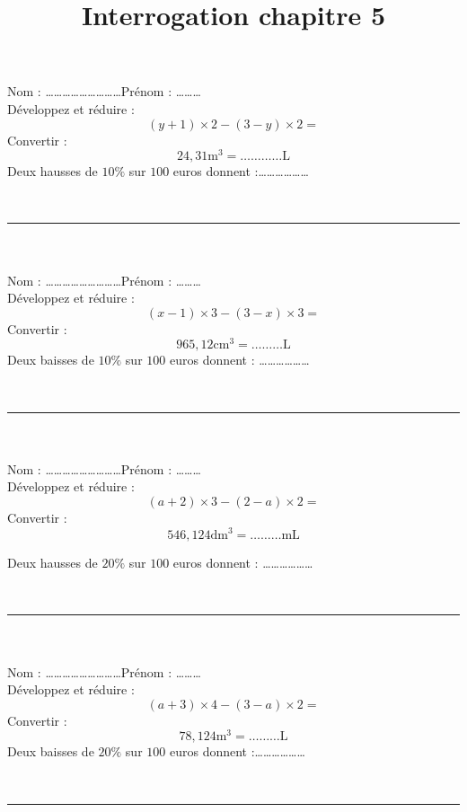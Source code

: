 \documentclass[14 pt, fleqn]{extarticle}
\title{Interrogation chapitre 5}
\date{}
\theoremstyle{plain}
\begin{document}
 Nom : \ldots\ldots\ldots\ldots\ldots\ldots\ldots\ldots\ldots Prénom : \ldots\ldots\ldots \\ 
Développez et réduire :
 \[ (y+1)\times 2 - (3 - y) \times 2 = \]
 Convertir : 
 \[ 24,31 \text{m}^3 = \ldots\ldots\ldots\ldots \text{L}\]
Deux hausses de $10 \%$ sur $100$ euros donnent :\ldots\ldots\ldots\ldots\ldots\ldots 
 
 \ \\  
 \hrule
 \ \\ \ \\
 Nom : \ldots\ldots\ldots\ldots\ldots\ldots\ldots\ldots\ldots Prénom : \ldots\ldots\ldots \\ 
Développez et réduire :
\[(x-1)\times 3 - (3 - x) \times 3 = \]
 Convertir : 
 \[ 965,12\text{cm}^3 = \ldots\ldots\ldots \text{L}\]
Deux baisses de $10 \%$ sur $100$ euros donnent : \ldots\ldots\ldots\ldots\ldots\ldots
 
 \ \\  
 
 \hrule
 \ \\ \ \\
 Nom : \ldots\ldots\ldots\ldots\ldots\ldots\ldots\ldots\ldots Prénom : \ldots\ldots\ldots \\ 
Développez et réduire :
 \[ (a+2)\times 3 - (2- a) \times 2  = \]
 Convertir : 
 \[ 546,124 \text{dm}^3 = \ldots\ldots\ldots \text{mL}\]
 
Deux hausses de $20 \%$ sur $100$ euros donnent : \ldots\ldots\ldots\ldots\ldots\ldots
 
 \ \\ 
 \hrule
 \ \\ \ \\
 Nom : \ldots\ldots\ldots\ldots\ldots\ldots\ldots\ldots\ldots Prénom : \ldots\ldots\ldots \\ 
Développez et réduire :
 \[ (a+3)\times 4 - (3 - a) \times 2 = \]
 Convertir : 
 \[ 78,124 \text{m}^3 = \ldots\ldots\ldots \text{L}\]
Deux baisses de $20 \%$ sur $100$ euros donnent :\ldots\ldots\ldots\ldots\ldots\ldots 
 
 \ \\  
 \hrule
 
 
 
 	
\end{document}
